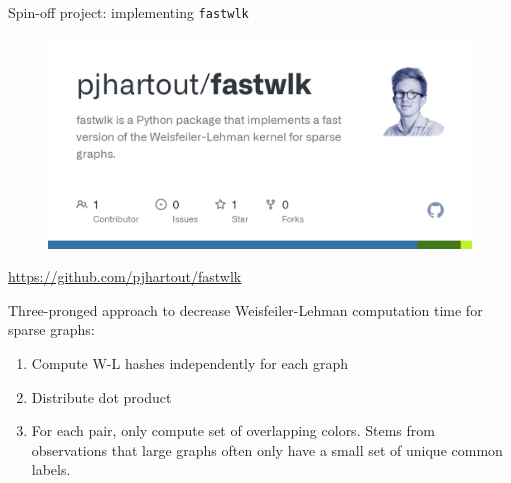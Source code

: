\documentclass[aspectratio=169, 10pt, dvipsnames]{beamer}
\begin{document}
\begin{frame}[allowframebreaks]{}
  
  

\end{frame}

{
  \begin{frame}[fragile]{Spin-off project: implementing \texttt{fastwlk}}
    \begin{minipage}{0.45\textwidth}
      \begin{figure}
        \centering
        \includegraphics[width=\textwidth]{./figures/fastwlk.png}
      \end{figure}
      \small\url{https://github.com/pjhartout/fastwlk}
    \end{minipage}
    \hfill
    \begin{minipage}{0.45\textwidth}
      \pause Three-pronged approach to decrease Weisfeiler-Lehman computation
      time for sparse graphs:
      \begin{enumerate}
        \pause\item Compute W-L hashes independently for each graph
        \pause\item Distribute dot product
        \pause\item For each pair, only compute set of overlapping colors. Stems
        from observations that large graphs often only have a small set of unique
        common labels.
      \end{enumerate}
    \end{minipage}

  \end{frame}
}
\end{document}
